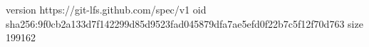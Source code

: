 version https://git-lfs.github.com/spec/v1
oid sha256:9f0cb2a133d7f142299d85d9523fad045879dfa7ae5efd0f22b7c5f12f70d763
size 199162
